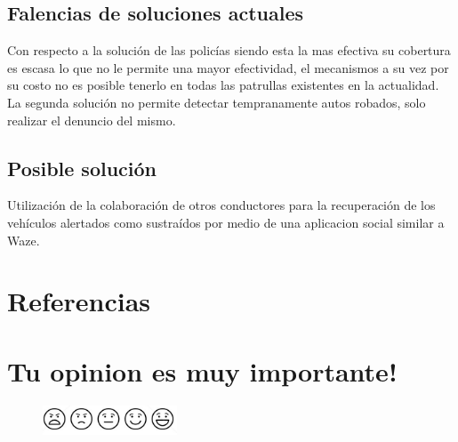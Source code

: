 \documentclass[12pt,letterpaper]{article}
\begin{document}
\subsection{Falencias de soluciones actuales}
Con respecto a la solución de las policías siendo esta la mas efectiva su cobertura es escasa lo que no le permite una mayor efectividad, el mecanismos a su vez por su costo no es posible tenerlo en todas las patrullas existentes en la actualidad.
La segunda solución no permite detectar tempranamente autos robados, solo realizar el denuncio del mismo.


\subsection{Posible solución}
Utilización de la colaboración de otros conductores para la recuperación de los vehículos alertados como sustraídos por medio de una aplicacion social similar a Waze.



\section{Referencias\label{sec:references}}

\printbibliography[heading=none]

\section{Tu opinion es muy importante!}
\begin{figure}
    \centering
    \includegraphics[width=4cm]{./images/vote.png}
    \captionsetup{justification=centering, singlelinecheck=false}
\end{figure}
\end{document}

